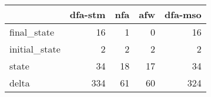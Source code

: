 \begin{tabular}{lrrrr}
\toprule
{} &  dfa-stm &  nfa &  afw &  dfa-mso \\
\midrule
final\_state   &       16 &    1 &    0 &       16 \\
initial\_state &        2 &    2 &    2 &        2 \\
state         &       34 &   18 &   17 &       34 \\
delta         &      334 &   61 &   60 &      324 \\
\bottomrule
\end{tabular}
